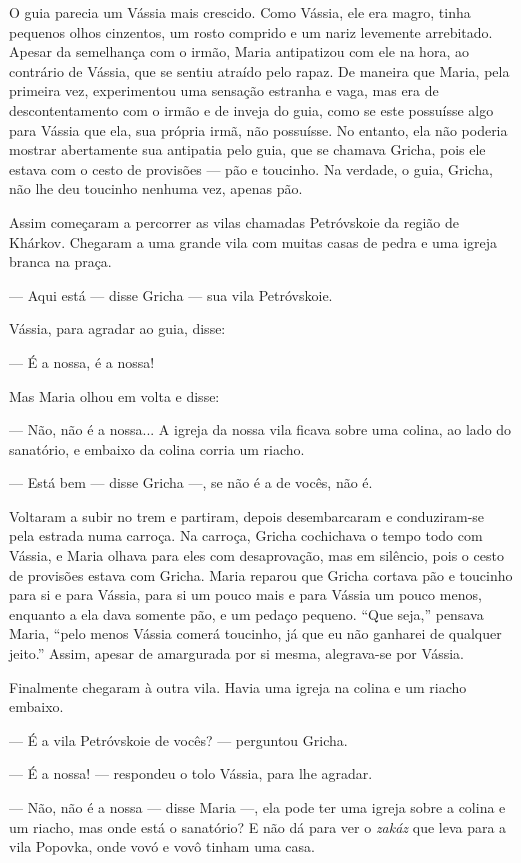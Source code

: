 O guia parecia um Vássia mais crescido. Como Vássia, ele era magro,
tinha pequenos olhos cinzentos, um rosto comprido e um nariz levemente
arrebitado. Apesar da semelhança com o irmão, Maria antipatizou com ele
na hora, ao contrário de Vássia, que se sentiu atraído pelo rapaz. De
maneira que Maria, pela primeira vez, experimentou uma sensação estranha
e vaga, mas era de descontentamento com o irmão e de inveja do guia,
como se este possuísse algo para Vássia que ela, sua própria irmã, não
possuísse. No entanto, ela não poderia mostrar abertamente sua antipatia
pelo guia, que se chamava Gricha, pois ele estava com o cesto de
provisões --- pão e toucinho. Na verdade, o guia, Gricha, não lhe deu
toucinho nenhuma vez, apenas pão.

Assim começaram a percorrer as vilas chamadas Petróvskoie da região de
Khárkov. Chegaram a uma grande vila com muitas casas de pedra e uma
igreja branca na praça.

--- Aqui está --- disse Gricha --- sua vila Petróvskoie.

Vássia, para agradar ao guia, disse:

--- É a nossa, é a nossa!

Mas Maria olhou em volta e disse:

--- Não, não é a nossa... A igreja da nossa vila ficava sobre uma
colina, ao lado do sanatório, e embaixo da colina corria um riacho.

--- Está bem --- disse Gricha ---, se não é a de vocês, não é.

Voltaram a subir no trem e partiram, depois desembarcaram e
conduziram-se pela estrada numa carroça. Na carroça, Gricha cochichava o
tempo todo com Vássia, e Maria olhava para eles com desaprovação, mas em
silêncio, pois o cesto de provisões estava com Gricha. Maria reparou que
Gricha cortava pão e toucinho para si e para Vássia, para si um pouco
mais e para Vássia um pouco menos, enquanto a ela dava somente pão, e um
pedaço pequeno. ``Que seja,'' pensava Maria, ``pelo menos Vássia comerá
toucinho, já que eu não ganharei de qualquer jeito.'' Assim, apesar de
amargurada por si mesma, alegrava-se por Vássia.

Finalmente chegaram à outra vila. Havia uma igreja na colina e um riacho
embaixo.

--- É a vila Petróvskoie de vocês? --- perguntou Gricha.

--- É a nossa! --- respondeu o tolo Vássia, para lhe agradar.

--- Não, não é a nossa --- disse Maria ---, ela pode ter uma igreja
sobre a colina e um riacho, mas onde está o sanatório? E não dá para ver
o \emph{zakáz} que leva para a vila Popovka, onde vovó e vovô tinham uma
casa.

